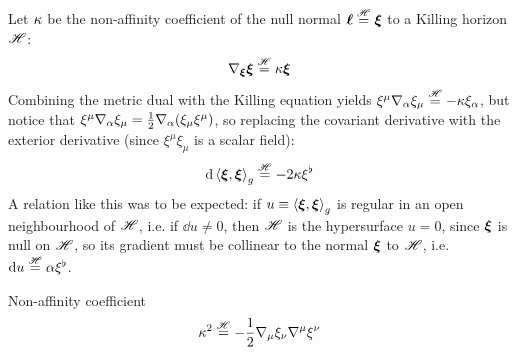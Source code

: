 Let $ \kappa $ be the non-affinity coefficient of the null normal $ \boldsymbol{\ell} \overset{\mathscr{H}}{=} \boldsymbol{\xi} $ to a Killing horizon $ \mathscr{H} $:
\begin{equation*}
  \nabla_{\boldsymbol{\xi}} \boldsymbol{\xi} \overset{\mathscr{H}}{=} \kappa \boldsymbol{\xi}
\end{equation*}
Combining the metric dual with the Killing equation  yields $ \xi^\mu \nabla_\alpha \xi_\mu \overset{\mathscr{H}}{=} - \kappa \xi_\alpha $, but notice that $ \xi^\mu \nabla_\alpha \xi_\mu = \frac{1}{2} \nabla_\alpha (\xi_\mu \xi^\mu) $, so replacing the covariant derivative with the exterior derivative (since $ \xi^\mu \xi_\mu $ is a scalar field):
\begin{equation}
  \mathrm{d} \braket{\boldsymbol{\xi} , \boldsymbol{\xi}}_g \overset{\mathscr{H}}{=} - 2 \kappa \xi^\flat
  \label{eq:surface-gravity-form}
\end{equation}
A relation like this was to be expected: if $ u \equiv \braket{\boldsymbol{\xi} , \boldsymbol{\xi}}_g $ is regular in an open neighbourhood of $ \mathscr{H} $, i.e. if $ \dd u \neq 0 $, then $ \mathscr{H} $ is the hypersurface $ u = 0 $, since $ \boldsymbol{\xi} $ is null on $ \mathscr{H} $, so its gradient must be collinear to the normal $ \boldsymbol{\xi} $ to $ \mathscr{H} $, i.e. $ \mathrm{d} u \overset{\mathscr{H}}{=} \alpha \xi^\flat $.

\begin{lemma}[before upper = {\tcbtitle}]{Non-affinity coefficient}{}
  \begin{equation}
    \kappa^2 \overset{\mathscr{H}}{=} - \frac{1}{2} \nabla_\mu \xi_\nu \nabla^\mu \xi^\nu
    \label{eq:surface-gravity}
  \end{equation}
\end{lemma}


